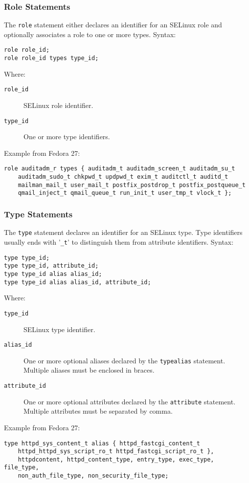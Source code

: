 \subsubsection{Role Statements}
The \texttt{role} statement either declares an identifier for an SELinux role
and optionally associates a role to one or more types. Syntax:
\begin{lstlisting}[language=te]
role role_id;
role role_id types type_id;
\end{lstlisting}
Where:
\begin{description}
    \item [\texttt{role\_id}] SELinux role identifier.
    \item [\texttt{type\_id}] One or more type identifiers.
\end{description}
Example from Fedora 27:
\begin{lstlisting}[language=te]
role auditadm_r types { auditadm_t auditadm_screen_t auditadm_su_t
    auditadm_sudo_t chkpwd_t updpwd_t exim_t auditctl_t auditd_t
    mailman_mail_t user_mail_t postfix_postdrop_t postfix_postqueue_t
    qmail_inject_t qmail_queue_t run_init_t user_tmp_t vlock_t };
\end{lstlisting}

\subsubsection{Type Statements}
The \texttt{type} statement declares an identifier for an SELinux type. Type
identifiers usually ends with '\texttt{\_t}' to distinguish them from attribute
identifiers. Syntax:
\begin{lstlisting}[language=te]
type type_id;
type type_id, attribute_id;
type type_id alias alias_id;
type type_id alias alias_id, attribute_id;
\end{lstlisting}
Where:
\begin{description}
    \item [\texttt{type\_id}] SELinux type identifier.
    \item [\texttt{alias\_id}] One or more optional aliases declared by the
        \texttt{typealias} statement. Multiple aliases must be enclosed in
        braces.
    \item [\texttt{attribute\_id}] One or more optional attributes declared by
        the \texttt{attribute} statement. Multiple attributes must be separated
        by comma.
\end{description}
Example from Fedora 27:
\begin{lstlisting}[language=te]
type httpd_sys_content_t alias { httpd_fastcgi_content_t
    httpd_httpd_sys_script_ro_t httpd_fastcgi_script_ro_t },
    httpdcontent, httpd_content_type, entry_type, exec_type, file_type,
    non_auth_file_type, non_security_file_type;
\end{lstlisting}

